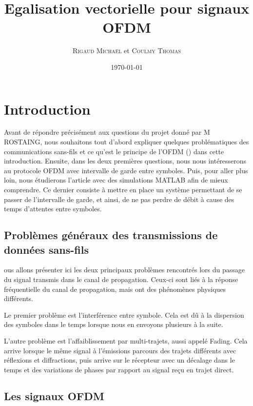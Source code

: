 \documentclass[a4paper, 11pt, oneside, oldfontcommands]{memoir}
\title{Egalisation vectorielle pour signaux OFDM}
\author{\textsc{Rigaud Michaël} et \textsc{Coulmy Thomas}}
\date{\today}
\newcounter{rem}[chapter]
\newcounter{th}[chapter]
\begin{document}
\maketitle
\thispagestyle{empty}
\newpage

\tableofcontents



\chapter*{Introduction}
Avant de répondre précisément aux questions du projet donné par M ROSTAING, nous
souhaitons tout d’abord expliquer quelques problématiques des communications
sans-fils et ce qu’est le principe de l’OFDM () dans cette introduction.
Ensuite, dans les deux premières questions, nous nous intéresserons au protocole
OFDM avec intervalle de garde entre symboles. Puis, pour aller plus loin, nous
étudierons l’article\cite{sujet} avec des simulations MATLAB afin de mieux comprendre.
Ce dernier consiste à mettre en place un système permettant de se passer de
l’intervalle de garde, et ainsi, de ne pas perdre de débit à cause des temps
d’attentes entre symboles.

\section*{Problèmes généraux des transmissions de données sans-fils}
ous allons présenter ici les deux principaux problèmes rencontrés lors du
passage du signal transmis dans le canal de propagation. Ceux-ci sont liés à la
réponse fréquentielle du canal de propagation, mais ont des phénomènes physiques
différents.

Le premier problème est l’interférence entre symbole. Cela est dû à la
dispersion des symboles dans le temps lorsque nous en envoyons plusieurs à la suite.

L’autre problème est l’affaiblissement par multi-trajets, aussi appelé Fading.
Cela arrive lorsque le même signal à l’émissions parcours des trajets différents
avec réflexions et diffractions, puis arrive sur le récepteur avec un décalage
dans le temps et des variations de phases par rapport au signal reçu en trajet direct.

\section*{Les signaux OFDM}
\end{document}
